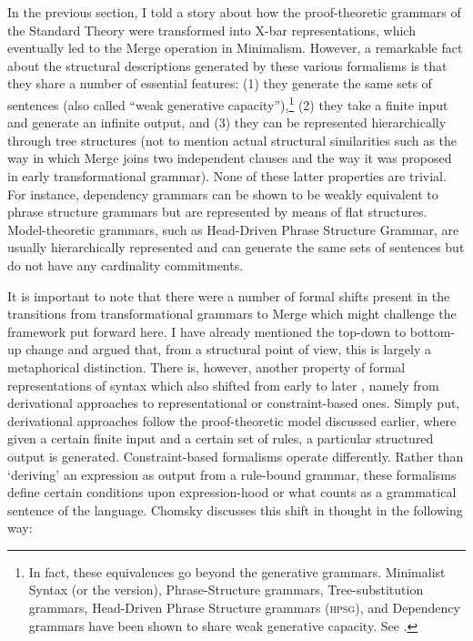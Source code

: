 \documentclass[output=paper]{langscibook}
\begin{document}
In the previous section, I told a story about how the proof-theoretic grammars of the Standard Theory were transformed into X-bar representations, which eventually led to the Merge operation in Minimalism. However, a remarkable fact about the structural descriptions generated by these various formalisms is that they share a number of essential features: (1) they generate the same sets of sentences (also called ``weak generative capacity''),\footnote{In fact, these equivalences go beyond the generative grammars.  Minimalist Syntax (or the \citealt{Stabler1997} version), Phrase-Structure grammars, Tree-substitution grammars, Head-Driven Phrase Structure grammars (\textsc{hpsg}), and Dependency grammars have been shown to share weak generative capacity. See \cite{Monnich2007}.} (2) they take a finite input and generate an infinite output, and (3) they can be represented hierarchically through tree structures (not to mention actual structural similarities such as the way in which Merge joins two independent clauses and the way it was proposed in early transformational grammar). None of these latter properties are trivial. For instance, dependency grammars can be shown to be weakly equivalent to phrase structure grammars but are represented by means of flat structures. Model-theoretic grammars, such as Head-Driven Phrase Structure Grammar, are usually hierarchically represented and can generate the same sets of sentences but do not have any cardinality commitments. 

It is important to note that there were a number of formal shifts present in the transitions from transformational grammars to Merge which might challenge the framework put forward here. I have already mentioned the top-down to bottom-up change and argued that, from a structural point of view, this is largely a metaphorical distinction. There is, however, another property of formal representations of syntax which also shifted from early to later , namely from derivational approaches to representational or constraint-based ones. Simply put, derivational approaches follow the proof-theoretic model discussed earlier, where given a certain finite input and a certain set of rules, a particular structured output is generated. Constraint-based formalisms operate differently. Rather than \textquoteleft deriving' an expression as output from a rule-bound grammar, these formalisms define certain conditions upon expression-hood or what counts as a grammatical sentence of the language. Chomsky discusses this shift in thought in the following way:
\end{document}
